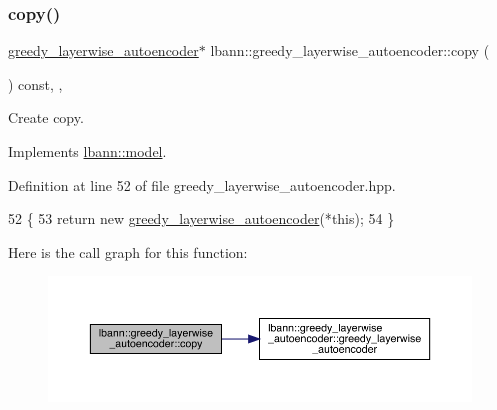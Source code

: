 \subsubsection{\texorpdfstring{copy()}{copy()}}
{\footnotesize\ttfamily \hyperlink{classlbann_1_1greedy__layerwise__autoencoder}{greedy\+\_\+layerwise\+\_\+autoencoder}$\ast$ lbann\+::greedy\+\_\+layerwise\+\_\+autoencoder\+::copy (\begin{DoxyParamCaption}{ }\end{DoxyParamCaption}) const\hspace{0.3cm}{\ttfamily [inline]}, {\ttfamily [override]}, {\ttfamily [virtual]}}

Create copy. 

Implements \hyperlink{classlbann_1_1model_aacd024c11f0897b33a7e7838b9433ba2}{lbann\+::model}.



Definition at line 52 of file greedy\+\_\+layerwise\+\_\+autoencoder.\+hpp.


\begin{DoxyCode}
52                                                       \{
53     \textcolor{keywordflow}{return} \textcolor{keyword}{new} \hyperlink{classlbann_1_1greedy__layerwise__autoencoder_a36dff325c3c756623b28cb056f91e058}{greedy\_layerwise\_autoencoder}(*\textcolor{keyword}{this});
54   \}
\end{DoxyCode}
Here is the call graph for this function\+:\nopagebreak
\begin{figure}[H]
\begin{center}
\leavevmode
\includegraphics[width=350pt]{classlbann_1_1greedy__layerwise__autoencoder_a435fa0830662ebde904b9e70902f7e16_cgraph}
\end{center}
\end{figure}
\mbox{\label{classlbann_1_1greedy__layerwise__autoencoder_af16aa7d2336a3f64e27970241cb2cd3e}} 
